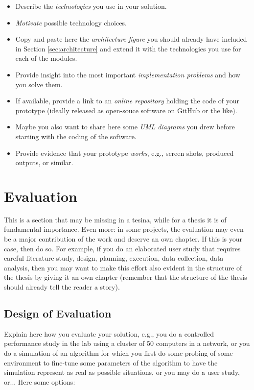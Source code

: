 \begin{itemize}
\item[\Square] Describe the \emph{technologies} you use in your solution.
\item[\Square] \emph{Motivate} possible technology choices.
\item[\Square] Copy and paste here the \emph{architecture figure} you should already have included in Section \ref{sec:architecture} and extend it with the technologies you use for each of the modules.
\item[\Square] Provide insight into the most important \emph{implementation problems} and how you solve them.
\item[\Square] If available, provide a link to an \emph{online repository} holding the code of your prototype (ideally released as open-souce software on GitHub or the like).
\item[\Square] Maybe you also want to share here some \emph{UML diagrams} you drew before starting with the coding of the software.
\item[\Square] Provide evidence that your prototype \emph{works}, e.g., screen shots, produced outputs, or similar.
\end{itemize}



\section{Evaluation}
This is a section that may be missing in a tesina, while for a thesis it is of fundamental importance. Even more: in some projects, the evaluation may even be a major contribution of the work and deserve an own chapter. If this is your case, then do so. For example, if you do an elaborated user study that requires careful literature study, design, planning, execution, data collection, data analysis, then you may want to make this effort also evident in the structure of the thesis by giving it an own chapter (remember that the structure of the thesis should already tell the reader a story).

\subsection{Design of Evaluation}
Explain here how you evaluate your solution, e.g., you do a controlled performance study in the lab using a cluster of 50 computers in a network, or you do a simulation of an algorithm for which you first do some probing of some environment to fine-tune some parameters of the algorithm to have the simulation represent as real as possible situations, or you may do a user study, or... Here some options:

